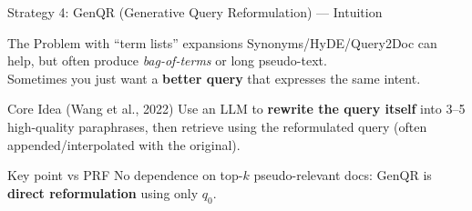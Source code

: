 \documentclass[aspectratio=169]{beamer}
\begin{document}
\begin{frame}{Strategy 4: GenQR (Generative Query Reformulation) --- Intuition}
\begin{exampleblock}{The Problem with ``term lists'' expansions}
Synonyms/HyDE/Query2Doc can help, but often produce \emph{bag-of-terms} or long pseudo-text.\\
Sometimes you just want a \textbf{better query} that expresses the same intent.
\end{exampleblock}

\vspace{0.5em}

\begin{block}{Core Idea (Wang et al., 2022)}
Use an LLM to \textbf{rewrite the query itself} into 3--5 high-quality paraphrases, then retrieve using the reformulated query (often appended/interpolated with the original).
\end{block}

\vspace{0.8em}

\begin{center}
\end{center}

\vspace{0.3em}
\begin{alertblock}{Key point vs PRF}
No dependence on top-$k$ pseudo-relevant docs: GenQR is \textbf{direct reformulation} using only $q_0$.
\end{alertblock}
\end{frame}
\end{document}
